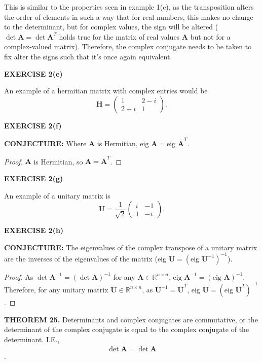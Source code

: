 \documentclass[12pt]{article}
\newcommand{\mat}[1]{\mathbf{#1}}
\newcommand{\exercise}[1]{\textbf{EXERCISE #1}\label{#1}}
\newcommand{\theorem}[2]{\textbf{THEOREM #1.} #2}
\newcommand{\conjecture}[1]{\textbf{CONJECTURE:} #1}
\newcommand{\eig}{\text{eig }}
\newcommand{\ct}[1]{\mat{\overline{#1}}^{T}}
\begin{document}
This is similar to the properties seen in example 1(c), as the transposition alters the order of elements in such a way that for real numbers, this makes no change to the determinant, but for complex values, the sign will be altered ($\det \mat{A} = \det \mat{A}^{T}$ holds true for the matrix of real values $\mat{A}$ but not for a complex-valued matrix). Therefore, the complex conjugate needs to be taken to fix alter the signs such that it's once again equivalent.

\exercise{2(e)}

An example of a hermitian matrix with complex entries would be
\begin{equation*}
\mat{H} = \begin{pmatrix} 1 & 2-i \\ 2+i & 1 \end{pmatrix}.
\end{equation*}

\exercise{2(f)}

\conjecture{Where $\mat{A}$ is Hermitian, $\eig \mat{A} = \eig \ct{A}$.}

\begin{proof}
$\mat{A}$ is Hermitian, so $\mat{A} = \ct{A}$.
\end{proof}

\exercise{2(g)}

An example of a unitary matrix is
\begin{equation*}
\mat{U} = \frac{1}{\sqrt{2}}  \begin{pmatrix} i & -1 \\ 1 & -i \end{pmatrix}.
\end{equation*}

\exercise{2(h)}

\conjecture{The eigenvalues of the complex transpose of a unitary matrix are the inverses of the eigenvalues of the matrix ($\eig \mat{U} = (\eig \mat{U}^{-1})^{-1}$).}

\begin{proof}
As $\det \mat{A}^{-1} = (\det \mat{A})^{-1}$ for any $\mat{A} \in \mathbb{R}^{n \times n}$, $\eig \mat{A}^{-1} = (\eig \mat{A})^{-1}$. Therefore, for any unitary matrix $\mat{U} \in \mathbb{R}^{n \times n}$, as $\mat{U}^{-1} = \ct{U}$, $\eig \mat{U} = (\eig \ct{U})^{-1}$.
\end{proof}

\theorem{25}{Determinants and complex conjugates are commutative, or the determinant of the complex conjugate is equal to the complex conjugate of the determinant. I.E.,
\begin{equation*}
\det \overline{\mat{A}} = \overline{\det \mat{A}}
\end{equation*}.}
\end{document}
